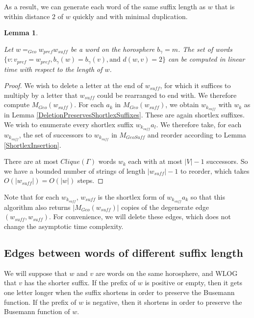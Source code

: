 \documentclass{amsart}
\newtheorem{lemma}[theorem]{Lemma}
\theoremstyle{definition}
\theoremstyle{remark}
\begin{document}
	As a result, we can generate each word of the same suffix length as $w$ that is within distance $2$ of $w$ quickly and with minimal duplication.
	
	\begin{lemma} \label{RipsEdgesSameSuffixLength}
		
		Let $w=_{Geo}w_{pref}w_{suff}$ be a word on the horosphere $b_\gamma=m$. The set of words $\{v: v_{pref}=w_{pref}, b_\gamma (w)=b_\gamma(v), \text{and } d(w,v)=2\}$ can be computed in linear time with respect to the length of $w$.
		
	\end{lemma}
	
	
	\begin{proof}
		
		We wish to delete a letter at the end of $w_{suff}$, for which it suffices to multiply by a letter that $w_{suff}$ could be rearranged to end with. We therefore compute $M_{Geo}(w_{suff})$. For each $a_k$ in $M_{Geo}(w_{suff})$, we obtain $w_{k_{suff}}$ with $w_k$ as in Lemma \ref{DeletionPreservesShortlexSuffixes}. These are again shortlex suffixes. We wish to enumerate every shortlex suffix $w_{k_{suff}}a_l$. We therefore take, for each $w_{k_{suff}}$, the set of successors to $w_{k_{suff}}$ in $M_{GeoSuff}$ and reorder according to Lemma \ref{ShortlexInsertion}.
		
		There are at most $Clique(\Gamma)$ words $w_k$ each with at most $|V|-1$ successors. So we have a bounded number of strings of length $|w_{suff}|-1$ to reorder, which takes $O(|w_{suff}|)=O(|w|)$ steps. 
	\end{proof}
	
	Note that for each $w_{k_{suff}}$, $w_{suff}$ is the shortlex form of $w_{k_{suff}}a_k$ so that this algorithm also returns $|M_{Geo}(w_{suff})|$ copies of the degenerate edge $(w_{suff}, w_{suff})$. For convenience, we will delete these edges, which does not change the asymptotic time complexity.
	
	\subsection{Edges between words of different suffix length}
	\label{subsec:RipsEdgesDifferentLength}
	
	We will suppose that $w$ and $v$ are words on the same horosphere, and WLOG that $v$ has the shorter suffix. If the prefix of $w$ is positive or empty, then it gets one letter longer when the suffix shortens in order to preserve the Busemann function. If the prefix of $w$ is negative, then it shortens in order to preserve the Busemann function of $w$.
	
\end{document}

